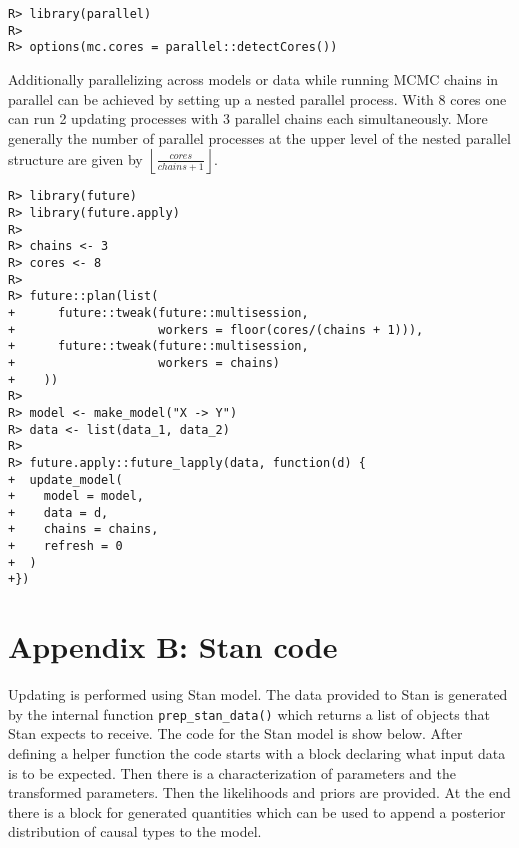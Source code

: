 \documentclass[
  11pt,
  article]{jss}
\begin{document}
\begin{verbatim}
R> library(parallel)
R> 
R> options(mc.cores = parallel::detectCores())
\end{verbatim}

Additionally parallelizing across models or data while running MCMC
chains in parallel can be achieved by setting up a nested parallel
process. With 8 cores one can run 2 updating processes with 3 parallel
chains each simultaneously. More generally the number of parallel
processes at the upper level of the nested parallel structure are given
by \(\left \lfloor \frac{cores}{chains + 1} \right \rfloor\).

\begin{verbatim}
R> library(future)
R> library(future.apply)
R> 
R> chains <- 3
R> cores <- 8
R> 
R> future::plan(list(
+      future::tweak(future::multisession, 
+                    workers = floor(cores/(chains + 1))),
+      future::tweak(future::multisession, 
+                    workers = chains)
+    ))
R> 
R> model <- make_model("X -> Y")
R> data <- list(data_1, data_2)
R> 
R> future.apply::future_lapply(data, function(d) {
+  update_model(
+    model = model,
+    data = d,
+    chains = chains,
+    refresh = 0
+  )
+})
\end{verbatim}

\hypertarget{sec-stancode}{%
\section*{Appendix B: Stan code}\label{sec-stancode}}

Updating is performed using Stan model. The data provided to Stan is
generated by the internal function \texttt{prep\_stan\_data()} which
returns a list of objects that Stan expects to receive. The code for the
Stan model is show below. After defining a helper function the code
starts with a block declaring what input data is to be expected. Then
there is a characterization of parameters and the transformed
parameters. Then the likelihoods and priors are provided. At the end
there is a block for generated quantities which can be used to append a
posterior distribution of causal types to the model.
\end{document}
